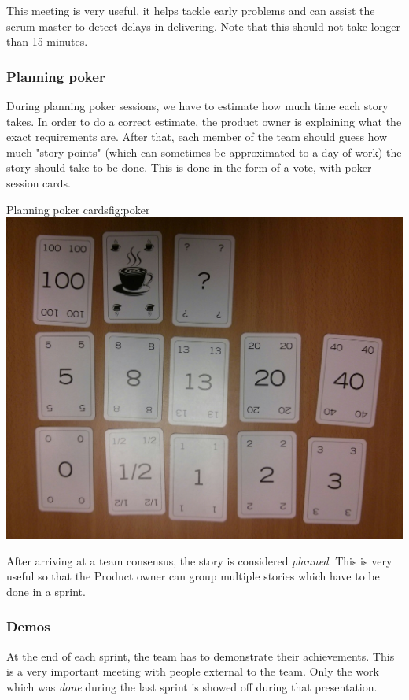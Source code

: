 This meeting is very useful, it helps tackle early problems and can assist the \gls{scrum} master to detect delays in delivering.
Note that this should not take longer than 15 minutes.


\subsubsection{Planning poker}
During planning poker sessions, we have to estimate how much time each story takes. In order to do a correct estimate,
the product owner is explaining what the exact requirements are. After that, each member of the team should guess
how much "story points" (which can sometimes be approximated to a day of work) the story should take to be done.
This is done in the form of a vote, with poker session cards.

\begin{figureGraphics}{Planning poker cards}{fig:poker}
\includegraphics[width=\textwidth]{./src/img/poker.jpg}
\end{figureGraphics}

After arriving at a team consensus, the story is considered \emph{planned}. This
is very useful so that the Product owner can group multiple stories which have
to be done in a sprint.


\subsubsection{Demos}
At the end of each sprint, the team has to demonstrate their achievements. This
is a very important meeting with people external to the team. Only the work
which was \emph{done} during the last sprint is showed off during that presentation.


